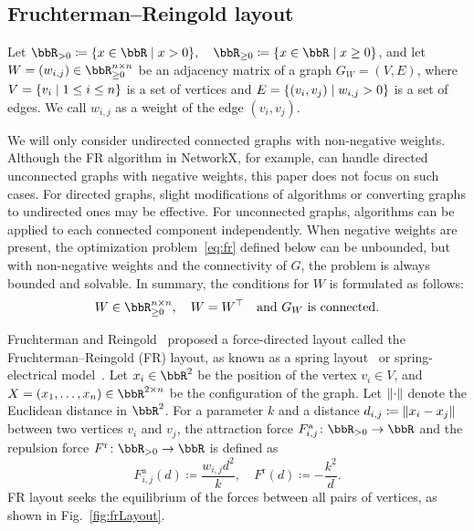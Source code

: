 \documentclass[dvipdfmx,journal]{IEEEtran}
\newcommand{\defeq}{\coloneqq}
\begin{document}
\subsection{Fruchterman--Reingold layout}\label{ssec:frLayout}

Let $\bbR_{> 0} \defeq \qty{ x \in \bbR \mid x > 0 }, \quad \bbR_{\geq 0} \defeq \qty{ x \in \bbR \mid x \geq 0 }$, and let $W = (w_{i,j}) \in \bbR_{\geq 0}^{n \times n}$ be an adjacency matrix of a graph $G_W = (V, E)$, where $V = \qty{v_i \mid 1 \leq i \leq n}$ is a set of vertices and $E = \qty{(v_i, v_j) \mid w_{i,j} > 0}$ is a set of edges. We call $w_{i,j}$ as a weight of the edge $(v_i, v_j)$.

We will only consider undirected connected graphs with non-negative weights.
Although the FR algorithm in NetworkX, for example, can handle directed unconnected graphs with negative weights, this paper does not focus on such cases.
For directed graphs, slight modifications of algorithms or converting graphs to undirected ones may be effective.
For unconnected graphs, algorithms can be applied to each connected component independently.
When negative weights are present, the optimization problem~\eqref{eq:fr} defined below can be unbounded, but with non-negative weights and the connectivity of $G$, the problem is always bounded and solvable.
In summary, the conditions for $W$ is formulated as follows:
\begin{equation}\label{eq:WCondition}
  W \in \bbR_{\geq 0}^{n \times n}, \quad W = W^\top \quad \text{and $G_W$ is connected}.
\end{equation}

Fruchterman and Reingold~\cite{fruchtermanGraphDrawingForcedirected1991} proposed a force-directed layout called the Fruchterman--Reingold (FR) layout, as known as a spring layout~\cite{hagberg2008exploring} or spring-electrical model~\cite{Hu2006EfficientHF}.
Let $x_i \in \bbR^2$ be the position of the vertex $v_i \in V$, and $X = (x_1, \dots, x_n) \in \bbR^{2 \times n}$ be the configuration of the graph.
Let $\norm{\cdot}$ denote the Euclidean distance in $\bbR^2$. For a parameter $k$ and a distance $d_{i,j} \defeq \norm{x_i - x_j}$ between two vertices $v_i$ and $v_j$, the attraction force $F_{i,j}^\mathrm{a}\colon \bbR_{> 0} \to \bbR$ and the repulsion force $F^\mathrm{r}\colon \bbR_{> 0} \to \bbR$ is defined as
\begin{equation*}
  F_{i,j}^\mathrm{a}(d) \defeq \frac{w_{i,j} d^2}{k}, \quad F^\mathrm{r}(d) \defeq -\frac{k^2}{d}.
\end{equation*}
FR layout seeks the equilibrium of the forces between all pairs of vertices, as shown in Fig.~\ref{fig:frLayout}.
\end{document}
